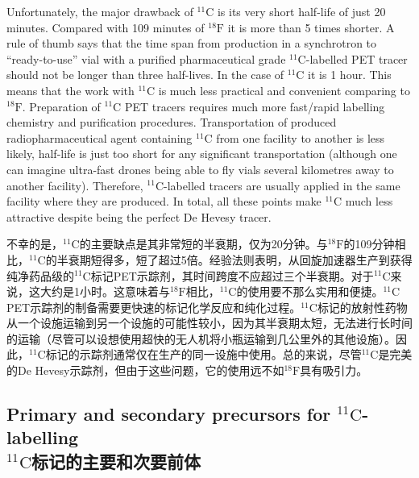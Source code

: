 \documentclass[dvipsnames, svgnames,a4paper,11pt]{article}
\begin{document}
Unfortunately, the major drawback of ${}^\mathrm{11}\mathrm{C}$ is its very short half-life of just 20 minutes.
Compared with 109 minutes of ${}^\mathrm{18}\mathrm{F}$ it is more than 5 times shorter. A rule of thumb
says that the time span from production in a synchrotron to “ready-to-use” vial with a
purified pharmaceutical grade ${}^\mathrm{11}\mathrm{C}$-labelled PET tracer should not be longer than
three half-lives. In the case of ${}^\mathrm{11}\mathrm{C}$ it is 1 hour. This means that the work with ${}^\mathrm{11}\mathrm{C}$ is
much less practical and convenient comparing to ${}^\mathrm{18}\mathrm{F}$. Preparation of ${}^\mathrm{11}\mathrm{C}$ PET tracers
requires much more fast/rapid labelling chemistry and purification procedures.
Transportation of produced radiopharmaceutical agent containing ${}^\mathrm{11}\mathrm{C}$ from one
facility to another is less likely, half-life is just too short for any significant
transportation (although one can imagine ultra-fast drones being able to fly vials
several kilometres away to another facility). Therefore, ${}^\mathrm{11}\mathrm{C}$-labelled tracers are
usually applied in the same facility where they are produced. In total, all these points
make ${}^\mathrm{11}\mathrm{C}$ much less attractive despite being the perfect De Hevesy tracer.

不幸的是，${}^\mathrm{11}\mathrm{C}$的主要缺点是其非常短的半衰期，仅为20分钟。与${}^\mathrm{18}\mathrm{F}$的109分钟相比，${}^\mathrm{11}\mathrm{C}$的半衰期短得多，短了超过5倍。经验法则表明，从回旋加速器生产到获得纯净药品级的${}^\mathrm{11}\mathrm{C}$标记PET示踪剂，其时间跨度不应超过三个半衰期。对于${}^\mathrm{11}\mathrm{C}$来说，这大约是1小时。这意味着与${}^\mathrm{18}\mathrm{F}$相比，${}^\mathrm{11}\mathrm{C}$的使用要不那么实用和便捷。${}^\mathrm{11}\mathrm{C}$ PET示踪剂的制备需要更快速的标记化学反应和纯化过程。${}^\mathrm{11}\mathrm{C}$标记的放射性药物从一个设施运输到另一个设施的可能性较小，因为其半衰期太短，无法进行长时间的运输（尽管可以设想使用超快的无人机将小瓶运输到几公里外的其他设施）。因此，${}^\mathrm{11}\mathrm{C}$标记的示踪剂通常仅在生产的同一设施中使用。总的来说，尽管${}^\mathrm{11}\mathrm{C}$是完美的De Hevesy示踪剂，但由于这些问题，它的使用远不如${}^\mathrm{18}\mathrm{F}$具有吸引力。

\subsection{Primary and secondary precursors for ${}^\mathrm{11}\mathrm{C}$-labelling \\${}^\mathrm{11}\mathrm{C}$标记的主要和次要前体}
\end{document}
